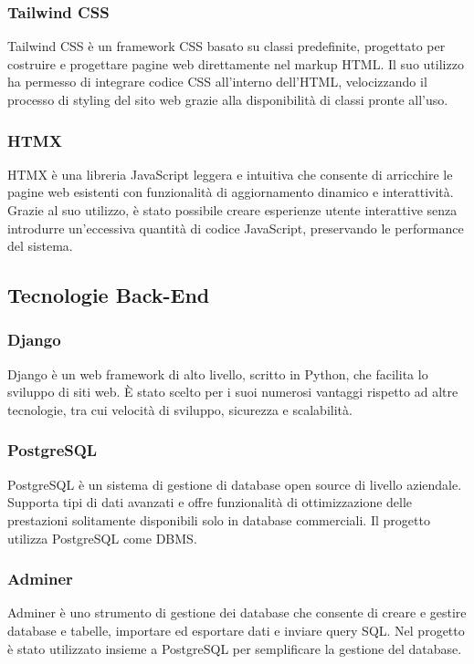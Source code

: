 \subsubsection{Tailwind CSS}
Tailwind CSS è un framework CSS basato su classi predefinite, progettato per costruire e progettare pagine web direttamente nel markup HTML. Il suo utilizzo ha permesso di integrare codice CSS all’interno dell’HTML, velocizzando il processo di styling del sito web grazie alla disponibilità di classi pronte all'uso.

\subsubsection{HTMX}
HTMX è una libreria JavaScript leggera e intuitiva che consente di arricchire le pagine web esistenti con funzionalità di aggiornamento dinamico e interattività. Grazie al suo utilizzo, è stato possibile creare esperienze utente interattive senza introdurre un'eccessiva quantità di codice JavaScript, preservando le performance del sistema.

\subsection{Tecnologie Back-End}
\subsubsection{Django}
Django è un web framework di alto livello, scritto in Python, che facilita lo sviluppo di siti web. È stato scelto per i suoi numerosi vantaggi rispetto ad altre tecnologie, tra cui velocità di sviluppo, sicurezza e scalabilità.

\subsubsection{PostgreSQL}
PostgreSQL è un sistema di gestione di database open source di livello aziendale. Supporta tipi di dati avanzati e offre funzionalità di ottimizzazione delle prestazioni solitamente disponibili solo in database commerciali. Il progetto utilizza PostgreSQL come DBMS.

\subsubsection{Adminer}
Adminer è uno strumento di gestione dei database che consente di creare e gestire database e tabelle, importare ed esportare dati e inviare query SQL. Nel progetto è stato utilizzato insieme a PostgreSQL per semplificare la gestione del database.

